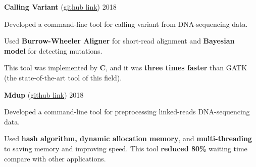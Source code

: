 

\begin{cventries}

  \cvsimpleentry
    {\textbf{Calling Variant} (\href{https://github.com/tuan-tt/calling_variant}{github link})} %
    {2018} %
    {
      \begin{cvitems} %
        \item {Developed a command-line tool for calling variant from DNA-sequencing data.}
        \item {Used \textbf{Burrow-Wheeler Aligner} for short-read alignment and \textbf{Bayesian model} for detecting mutations.}
        \item {This tool was implemented by \textbf{C}, and it was \textbf{three times faster} than GATK (the state-of-the-art tool of this field).}
      \end{cvitems}
    }

  \cvsimpleentry
    {\textbf{Mdup} (\href{https://github.com/kspham/mdup}{github link})} %
    {2018} %
    {
      \begin{cvitems} %
        \item {Developed a command-line tool for preprocessing linked-reads DNA-sequencing data.}
        \item {Used \textbf{hash algorithm, dynamic allocation memory}, and \textbf{multi-threading} to saving memory and improving speed. This tool \textbf{reduced 80\%} waiting time compare with other applications.}
      \end{cvitems}
    }

\end{cventries}
